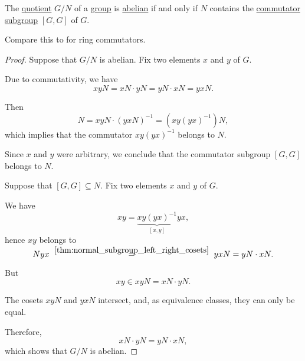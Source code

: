 \begin{proposition}\label{thm:quotient_is_abelian_iff_subgroup_contains_commutator}
  The \hyperref[def:group/quotient]{quotient} \( G / N \) of a \hyperref[def:group]{group} is \hyperref[def:abelian_group]{abelian} if and only if \( N \) contains the \hyperref[def:group_commutator]{commutator subgroup} \( [G, G] \) of \( G \).
\end{proposition}
\begin{comments}
  \item Compare this to  for ring commutators.
\end{comments}
\begin{proof}
  \SufficiencySubProof Suppose that \( G / N \) is abelian. Fix two elements \( x \) and \( y \) of \( G \).

  Due to commutativity, we have
  \begin{equation*}
    xyN = xN \cdot yN = yN \cdot xN = yxN.
  \end{equation*}

  Then
  \begin{equation*}
    N = xyN \cdot (yxN)^{-1} = (xy(yx)^{-1})N,
  \end{equation*}
  which implies that the commutator \( xy(yx)^{-1} \) belongs to \( N \).

  Since \( x \) and \( y \) were arbitrary, we conclude that the commutator subgroup \( [G, G] \) belongs to \( N \).

  \NecessitySubProof Suppose that \( [G, G] \subseteq N \). Fix two elements \( x \) and \( y \) of \( G \).

  We have
  \begin{equation*}
    xy = \underbrace{xy (yx)^{-1}}_{[x, y]} yx,
  \end{equation*}
  hence \( xy \) belongs to
  \begin{equation*}
    Nyx
    \reloset {\ref{thm:normal_subgroup_left_right_cosets}} =
    yxN
    =
    yN \cdot xN.
  \end{equation*}

  But
  \begin{equation*}
    xy \in xyN = xN \cdot yN.
  \end{equation*}

  The cosets \( xyN \) and \( yxN \) intersect, and, as equivalence classes, they can only be equal.

  Therefore,
  \begin{equation*}
    xN \cdot yN = yN \cdot xN,
  \end{equation*}
  which shows that \( G / N \) is abelian.
\end{proof}


